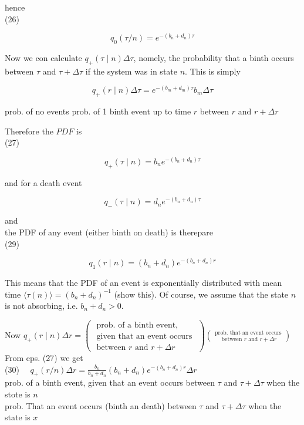 \documentclass[10pt]{article}
\begin{document}
hence\\
(26)

$$
q_{0}(\tau / n)=e^{-\left(b_{n}+d_{n}\right) \tau}
$$

Now we con calculate $q_{+}(\tau \mid n) \Delta \tau$, nomely, the probability that a binth occurs between $\tau$ and $\tau+\Delta \tau$ if the system was in state $n$. This is simply

$$
q_{+}(r \mid n) \Delta \tau=e^{-\left(b_{m}+d_{m}\right) \tau} b_{m} \Delta \tau
$$

prob. of no events prob. of 1 binth event up to time $r$ between $r$ and $r+\Delta r$

Therefore the $P D F$ is\\
(27)

$$
q_{+}(\tau \mid n)=b_{n} e^{-\left(b_{n}+d_{n}\right) \tau}
$$

and for a death event


\begin{equation*}
q_{-}(\tau \mid n)=d_{n} e^{-\left(b_{n}+d_{n}\right) \tau} \tag{28}
\end{equation*}


and\\
the PDF of any event (either binth on death) is therepare\\
(29)

$$
q_{1}(r \mid n)=\left(b_{n}+d_{n}\right) e^{-\left(b_{n}+d_{n}\right) r}
$$

This means that the PDF of an event is exponentially distributed with mean time $\langle\tau(n)\rangle=\left(b_{n}+d_{n}\right)^{-1}$ (show this). Of course, we assume that the state $n$ is not absorbing, i.e. $b_{n}+d_{n}>0$.

Now $q_{+}(r \mid n) \Delta r=\left(\begin{array}{c}\text { prob. of a binth event, } \\ \text { given that an event occurs } \\ \text { between } r \text { and } r+\Delta r\end{array}\right)\binom{\text { prob. that an event occurs }}{\text { between } r \text { and } r+\Delta r}$\\
From eps. (27) we get\\
(30) $\quad q_{+}(r / n) \Delta r=\frac{b_{n}}{b_{n}+d_{n}}\left(b_{n}+d_{n}\right) e^{-\left(b_{n}+d_{n}\right) r} \Delta r$\\
prob. of a binth event, given that an event occurs between $\tau$ and $\tau+\Delta \tau$ when the stote is $n$\\
prob. That an event occurs (binth an death) between $\tau$ and $\tau+\Delta \tau$ when the state is $x$
\end{document}
